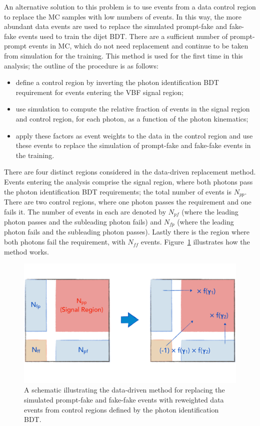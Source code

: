 An alternative solution to this problem is to use events from a data control region 
to replace the MC samples with low numbers of events.
In this way, the more abundant data events are used to replace the simulated prompt-fake and fake-fake 
events used to train the dijet BDT.
There are a sufficient number of prompt-prompt events in MC, 
which do not need replacement and continue to be taken from simulation for the training.
This method is used for the first time in this analysis;
the outline of the procedure is as follows:
\begin{itemize}
\item define a control region by inverting the photon identification BDT requirement 
      for events entering the VBF signal region;
\item use simulation to compute the relative fraction of events in the signal region and control region, 
      for each photon, as a function of the photon kinematics;
\item apply these factors as event weights to the data in the control region 
      and use these events to replace the simulation of prompt-fake and fake-fake events in the training.
\end{itemize}

There are four distinct regions considered in the data-driven replacement method.
Events entering the analysis comprise the signal region, 
where both photons pass the photon identification BDT requirements;
the total number of events is $N_{pp}$.
There are two control regions, where one photon passes the requirement and one fails it.
The number of events in each are denoted by $N_{pf}$ 
(where the leading photon passes and the subleading photon fails) and $N_{fp}$ 
(where the leading photon fails and the subleading photon passes).
Lastly there is the region where both photons fail the requirement, with $N_{ff}$ events.
Figure~\ref{fig:cat_DDschematic} illustrates how the method works.

\begin{figure}
  \centering
  \includegraphics[width=\textwidth]{Figures/Categorisation/DDschematic.pdf}
  \caption{A schematic illustrating the data-driven method for replacing the simulated
  prompt-fake and fake-fake events with reweighted data events from control regions 
  defined by the photon identification BDT.}
  \label{fig:cat_DDschematic}
\end{figure}

